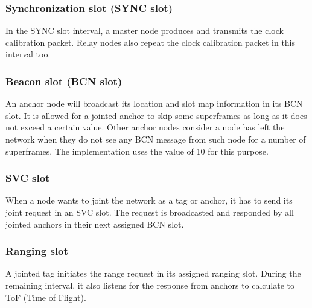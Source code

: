 \documentclass[\main/main.tex]{subfiles}
\begin{document}
\subsubsection{Synchronization slot (SYNC slot)}
In the SYNC slot interval, a master node produces and transmits the clock calibration packet. Relay nodes also repeat the clock calibration packet in this interval too.
\subsubsection{Beacon slot (BCN slot)}
An anchor node will broadcast its location and slot map information in its BCN slot. It is allowed for a jointed anchor to skip some superframes as long as it does not exceed a certain value. Other anchor nodes consider a node has left the network when they do not see any BCN message from such node for a number of superframes. The implementation uses the value of 10 for this purpose.
\subsubsection{SVC slot}
When a node wants to joint the network as a tag or anchor, it has to send its joint request in an SVC slot. The request is broadcasted and responded by all jointed anchors in their next assigned BCN slot.
\subsubsection{Ranging slot}
A jointed tag initiates the range request in its assigned ranging slot. During the remaining interval, it also listens for the response from anchors to calculate to ToF (Time of Flight).
\end{document}
